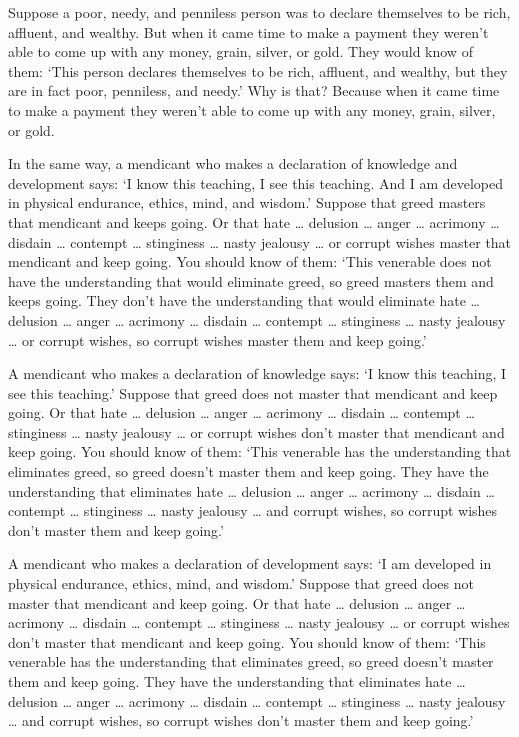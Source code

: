 \documentclass[12pt,openany]{book}%
\begin{document}
Suppose a poor, needy, and penniless person was to declare themselves to be rich, affluent, and wealthy. But when it came time to make a payment they weren’t able to come up with any money, grain, silver, or gold. They would know of them: ‘This person declares themselves to be rich, affluent, and wealthy, but they are in fact poor, penniless, and needy.’ Why is that? Because when it came time to make a payment they weren’t able to come up with any money, grain, silver, or gold. 

In the same way, a mendicant who makes a declaration of knowledge and development says: ‘I know this teaching, I see this teaching. And I am developed in physical endurance, ethics, mind, and wisdom.’ Suppose that greed masters that mendicant and keeps going. Or that hate … delusion … anger … acrimony … disdain … contempt … stinginess … nasty jealousy … or corrupt wishes master that mendicant and keep going. You should know of them: ‘This venerable does not have the understanding that would eliminate greed, so greed masters them and keeps going. They don’t have the understanding that would eliminate hate … delusion … anger … acrimony … disdain … contempt … stinginess … nasty jealousy … or corrupt wishes, so corrupt wishes master them and keep going.’ 

A mendicant who makes a declaration of knowledge says: ‘I know this teaching, I see this teaching.’ Suppose that greed does not master that mendicant and keep going. Or that hate … delusion … anger … acrimony … disdain … contempt … stinginess … nasty jealousy … or corrupt wishes don’t master that mendicant and keep going. You should know of them: ‘This venerable has the understanding that eliminates greed, so greed doesn’t master them and keep going. They have the understanding that eliminates hate … delusion … anger … acrimony … disdain … contempt … stinginess … nasty jealousy … and corrupt wishes, so corrupt wishes don’t master them and keep going.’ 

A mendicant who makes a declaration of development says: ‘I am developed in physical endurance, ethics, mind, and wisdom.’ Suppose that greed does not master that mendicant and keep going. Or that hate … delusion … anger … acrimony … disdain … contempt … stinginess … nasty jealousy … or corrupt wishes don’t master that mendicant and keep going. You should know of them: ‘This venerable has the understanding that eliminates greed, so greed doesn’t master them and keep going. They have the understanding that eliminates hate … delusion … anger … acrimony … disdain … contempt … stinginess … nasty jealousy … and corrupt wishes, so corrupt wishes don’t master them and keep going.’ 
\end{document}
